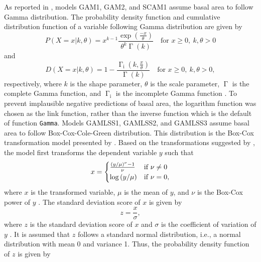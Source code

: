 As reported in , models GAM1, GAM2, and SCAM1 assume basal area to follow Gamma distribution.  The probability density function and cumulative distribution function of a variable following Gamma distribution are given by
\begin{equation}
  \label{eq:GammaDistributionPDF}
  P(X = x|k, \theta) = x^{k - 1} \frac{\exp{\left(\frac{-x}{\theta}\right)}}{\theta^k \upGamma(k)} \quad \text{for } x \geq 0, ~ k, \theta > 0
\end{equation}
and
\begin{equation}
  \label{eq:GammaDistributionCDF}
    D(X = x|k, \theta) = 1 - \frac{\upGamma_{\text{i}}\left(k, \frac{x}{\theta}\right)}{\upGamma(k)} \quad \text{for } x \geq 0, ~ k, \theta > 0,
\end{equation}
respectively, where \(k\) is the shape parameter, \(\theta\) is the scale parameter, \(\upGamma\) is the complete Gamma function, and \(\upGamma_{\text{i}}\) is the incomplete Gamma function \parencite{Weisstein2017b,Dormann2013,Lindgren1976}.  To prevent implausible negative predictions of basal area, the logarithm function was chosen as the link function, rather than the inverse function which is the default of function \texttt{Gamma}.  Models GAMLSS1, GAMLSS2, and GAMLSS3 assume basal area to follow Box-Cox-Cole-Green distribution. This distribution is the Box-Cox transformation model presented by \textcite{Cole1992} \parencite{Stasinopoulos2007}.  Based on the transformations suggested by \textcite{Box1964}, the model first transforms the dependent variable \(y\) such that
\begin{equation}
  \label{eq:BoxCoxColeGreenTransformation}
  x =
  \begin{cases}
    \frac{\left(
        y \middle/ \mu
      \right)^\nu - 1}{\nu} &\text{if } \nu \not = 0 \\
    \log\left(y \middle/ \mu\right) &\text{if } \nu = 0,
  \end{cases}
\end{equation}
where \(x\) is the transformed variable, \(\mu\) is the mean of \(y\), and \(\nu\) is the Box-Cox power of \(y\) \parencite{Cole1992}.
The standard deviation score of \(x\) is given by
\begin{equation}
  \label{eq:BoxCoxColeGreenSDScore}
  z = \frac{x}{\sigma},
\end{equation}
where \(z\) is the standard deviation score of \(x\) and \(\sigma\) is the coefficient of variation of \(y\) .  It is assumed that \(z\) follows a standard normal distribution, i.e., a normal distribution with mean 0 and variance 1. Thus, the probability density function of \(z\) is given by
